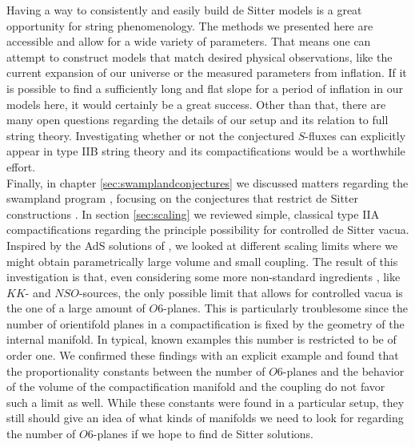 \documentclass[a4paper,12pt,twoside,openright]{report}
\begin{document}
Having a way to consistently and easily build de Sitter models is a great opportunity for string phenomenology. The methods we presented here are accessible and allow for a wide variety of parameters. That means one can attempt to construct models that match desired physical observations, like the current expansion of our universe or the measured parameters from inflation. If it is possible to find a sufficiently long  and flat slope for a period of inflation in our models here, it would certainly be a great success. Other than that, there are many open questions regarding the details of our setup and its relation to full string theory. Investigating whether or not the conjectured $S$-fluxes can explicitly appear in type IIB string theory and its compactifications would be a worthwhile effort.\\
Finally, in chapter \ref{sec:swamplandconjectures} we discussed matters regarding the swampland program \cite{Brennan:2017rbf,Palti:2019pca,vanBeest:2021lhn}, focusing on the conjectures that restrict de Sitter constructions \cite{Danielsson:2018ztv,Obied:2018sgi,Ooguri:2018wrx,Andriot:2018mav}. In section \ref{sec:scaling} we reviewed simple, classical type IIA compactifications regarding the principle possibility for controlled de Sitter vacua. Inspired by the AdS solutions of \cite{DeWolfe:2005uu}, we looked at different scaling limits where we might obtain parametrically large volume and small coupling. The result of this investigation is that, even considering some more non-standard ingredients \cite{Caviezel:2008tf,Flauger:2008ad,Saltman:2004jh,Silverstein:2007ac,Haque:2008jz,Danielsson:2009ff,deCarlos:2009fq,deCarlos:2009qm,Caviezel:2009tu,Danielsson:2010bc,Dong:2010pm,Andriot:2010ju}, like $KK$- and $NSO$-sources, the only possible limit that allows for controlled vacua is the one of a large amount of $O6$-planes. This is particularly troublesome since the number of orientifold planes in a compactification is fixed by the geometry of the internal manifold. In typical, known examples this number is restricted to be of order one. We confirmed these findings with an explicit example and found that the proportionality constants between the number of $O6$-planes and the behavior of the volume of the compactification manifold and the coupling do not favor such a limit as well. While these constants were found in a particular setup, they still should give an idea of what kinds of manifolds we need to look for regarding the number of $O6$-planes if we hope to find de Sitter solutions.\\
\end{document}
